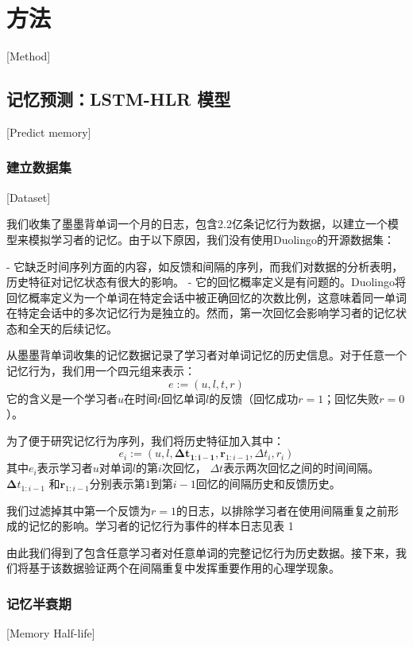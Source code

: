 \chapter{方法}[Method]

\section{记忆预测：LSTM-HLR 模型}[Predict memory]

\subsection{建立数据集}[Dataset]

我们收集了墨墨背单词一个月的日志，包含2.2亿条记忆行为数据，以建立一个模型来模拟学习者的记忆。由于以下原因，我们没有使用Duolingo的开源数据集：

- 它缺乏时间序列方面的内容，如反馈和间隔的序列，而我们对数据的分析表明，历史特征对记忆状态有很大的影响。
- 它的回忆概率定义是有问题的。Duolingo将回忆概率定义为一个单词在特定会话中被正确回忆的次数比例，这意味着同一单词在特定会话中的多次记忆行为是独立的。然而，第一次回忆会影响学习者的记忆状态和全天的后续记忆。

从墨墨背单词收集的记忆数据记录了学习者对单词记忆的历史信息。对于任意一个记忆行为，我们用一个四元组来表示：
\begin{equation}
e :=(u, l, t, r)
\end{equation}
它的含义是一个学习者$u$在时间$t$回忆单词$l$的反馈（回忆成功$r=1$；回忆失败$r=0$）。

为了便于研究记忆行为序列，我们将历史特征加入其中：
\begin{equation}
e_{i} :=(u, l, \boldsymbol{\Delta t_{1:i-1}}, \boldsymbol r_{1:i-1} , \Delta t_i , r_i)
\end{equation}
其中$e_i$表示学习者$u$对单词$l$的第$i$次回忆， $\Delta t$表示两次回忆之间的时间间隔。 $\boldsymbol \Delta t_{1:i-1}$  和$\boldsymbol r_{1:i-1}$分别表示第$1$到第$i-1$回忆的间隔历史和反馈历史。

我们过滤掉其中第一个反馈为$r=1$的日志，以排除学习者在使用间隔重复之前形成的记忆的影响。学习者的记忆行为事件的样本日志见表 1

由此我们得到了包含任意学习者对任意单词的完整记忆行为历史数据。接下来，我们将基于该数据验证两个在间隔重复中发挥重要作用的心理学现象。

\subsection{记忆半衰期}[Memory Half-life]

